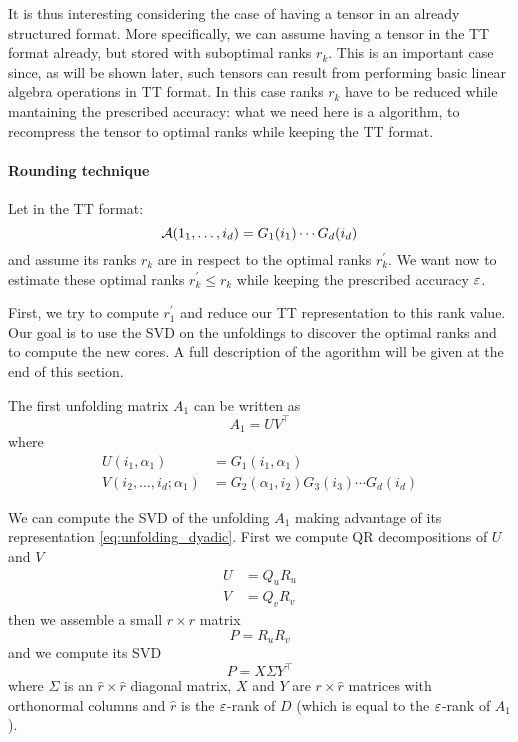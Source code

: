 It is thus interesting considering the case of having a tensor in an already structured format. More specifically, we can assume having a tensor in the TT format already, but stored with suboptimal ranks $r_k$. This is an important case since, as will be shown later, such tensors can result from performing basic linear algebra operations in TT format. In this case ranks $r_k$ have to be reduced while mantaining the prescribed accuracy: what we need here is a  algorithm, to recompress the tensor to optimal ranks while keeping the TT format.

\paragraph{Rounding technique}
Let \A in the TT format:
\begin{equation*}
  \mathcal{A}(1_1,\ldots,i_d) = G_1(i_1) \cdots G_d(i_d)
\end{equation*}
and assume its ranks $r_k$ are  in respect to the optimal ranks $r_k^\prime$. We want now to estimate these optimal ranks $r_k^\prime \le r_k$ while keeping the prescribed accuracy $\varepsilon$.

First, we try to compute $r_1^\prime$ and reduce our TT representation to this rank value. Our goal is to use the SVD on the unfoldings to discover the optimal ranks and to compute the new  cores. A full description of the agorithm will be given at the end of this section.

The first unfolding matrix $A_1$ can be written as
\begin{equation} \label{eq:unfolding_dyadic}
  A_1 = UV^\top
\end{equation}
where
\begin{equation} \label{def:UV}
  \begin{split}
    U(i_1,\alpha_1) &= G_1(i_1,\alpha_1)\\
    V(i_2,\ldots,i_d;\alpha_1) &= G_2(\alpha_1,i_2) G_3(i_3) \cdots G_d(i_d)
  \end{split}
\end{equation}

We can compute the SVD of the unfolding $A_1$ making advantage of its representation \ref{eq:unfolding_dyadic}. First we compute QR decompositions of $U$ and $V$
\begin{equation*}
  \begin{split}
    U &= Q_u R_u\\
    V &= Q_v R_v
  \end{split}
\end{equation*}
then we assemble a small $r \times r$ matrix
\begin{equation*}
  P = R_u R_v
\end{equation*}
and we compute its SVD
\begin{equation*}
  P = X \Sigma Y^\top
\end{equation*}
where $\Sigma$ is an $\hat{r}\times\hat{r}$ diagonal matrix, $X$ and $Y$ are $r \times \hat{r}$ matrices with orthonormal columns and $\hat{r}$ is the $\varepsilon$-rank of $D$ (which is equal to the $\varepsilon$-rank of $A_1$).


